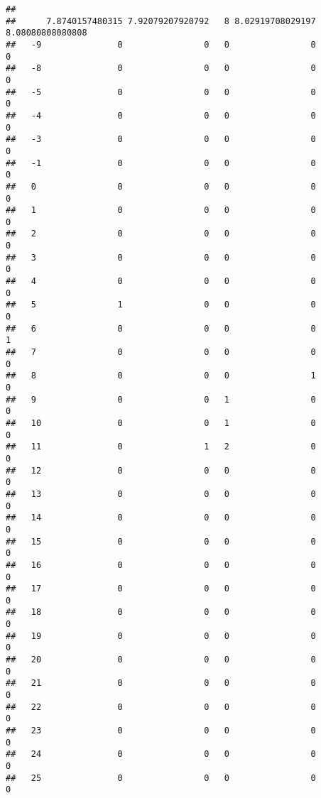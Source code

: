 \documentclass[]{article}
\begin{document}
\begin{verbatim}
##     
##      7.8740157480315 7.92079207920792   8 8.02919708029197 8.08080808080808
##   -9               0                0   0                0                0
##   -8               0                0   0                0                0
##   -5               0                0   0                0                0
##   -4               0                0   0                0                0
##   -3               0                0   0                0                0
##   -1               0                0   0                0                0
##   0                0                0   0                0                0
##   1                0                0   0                0                0
##   2                0                0   0                0                0
##   3                0                0   0                0                0
##   4                0                0   0                0                0
##   5                1                0   0                0                0
##   6                0                0   0                0                1
##   7                0                0   0                0                0
##   8                0                0   0                1                0
##   9                0                0   1                0                0
##   10               0                0   1                0                0
##   11               0                1   2                0                0
##   12               0                0   0                0                0
##   13               0                0   0                0                0
##   14               0                0   0                0                0
##   15               0                0   0                0                0
##   16               0                0   0                0                0
##   17               0                0   0                0                0
##   18               0                0   0                0                0
##   19               0                0   0                0                0
##   20               0                0   0                0                0
##   21               0                0   0                0                0
##   22               0                0   0                0                0
##   23               0                0   0                0                0
##   24               0                0   0                0                0
##   25               0                0   0                0                0

\end{verbatim}
\end{document}
